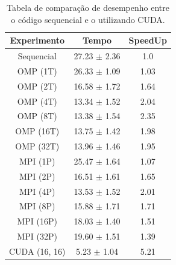 \documentclass[12pt]{article}
\begin{document}
\begin{table}[ht]
  \centering
  \caption{Tabela de comparação de desempenho entre o código sequencial e o
    utilizando CUDA.}\label{tab:Resultados}
  \vspace{0.3cm}
  \begin{tabular}{||c c c||}
    \hline
    Experimento   & Tempo            & SpeedUp \\ [0.5ex]
    \hline\hline
    Sequencial    & 27.23 $\pm$ 2.36 & 1.0     \\
    \hline
    OMP (1T)      & 26.33 $\pm$ 1.09 & 1.03    \\
    \hline
    OMP (2T)      & 16.58 $\pm$ 1.72 & 1.64    \\
    \hline
    OMP (4T)      & 13.34 $\pm$ 1.52 & 2.04    \\
    \hline
    OMP (8T)      & 13.38 $\pm$ 1.54 & 2.35    \\
    \hline
    OMP (16T)     & 13.75 $\pm$ 1.42 & 1.98    \\
    \hline
    OMP (32T)     & 13.96 $\pm$ 1.46 & 1.95    \\
    \hline
    MPI (1P)      & 25.47 $\pm$ 1.64 & 1.07    \\
    \hline
    MPI (2P)      & 16.51 $\pm$ 1.61 & 1.65    \\
    \hline
    MPI (4P)      & 13.53 $\pm$ 1.52 & 2.01    \\
    \hline
    MPI (8P)      & 15.88 $\pm$ 1.71 & 1.71    \\
    \hline
    MPI (16P)     & 18.03 $\pm$ 1.40 & 1.51    \\
    \hline
    MPI (32P)     & 19.60 $\pm$ 1.51 & 1.39    \\
    \hline
    CUDA (16, 16) & 5.23 $\pm$ 1.04  & 5.21    \\
    \hline
  \end{tabular}
\end{table}
\end{document}
